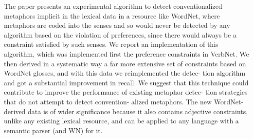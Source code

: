 The paper presents an experimental algorithm to detect conventionalized metaphors implicit in the lexical data in a resource like WordNet, where
 metaphors are coded into the senses and so would never be detected by any
 algorithm based on the violation of preferences, since there would always be a
 constraint satisfied by such senses. We report an implementation of this
 algorithm, which was implemented first the preference constraints in VerbNet.
 We then derived in a systematic way a far more extensive set of constraints
 based on WordNet glosses, and with this data we reimplemented the detec- tion
 algorithm and got a substantial improvement in recall. We suggest that this
 technique could contribute to improve the performance of existing metaphor
 detec- tion strategies that do not attempt to detect convention- alized
 metaphors. The new WordNet-derived data is of wider significance because it
 also contains adjective constraints, unlike any existing lexical resource, and
 can be applied to any language with a semantic parser (and WN) for it.

